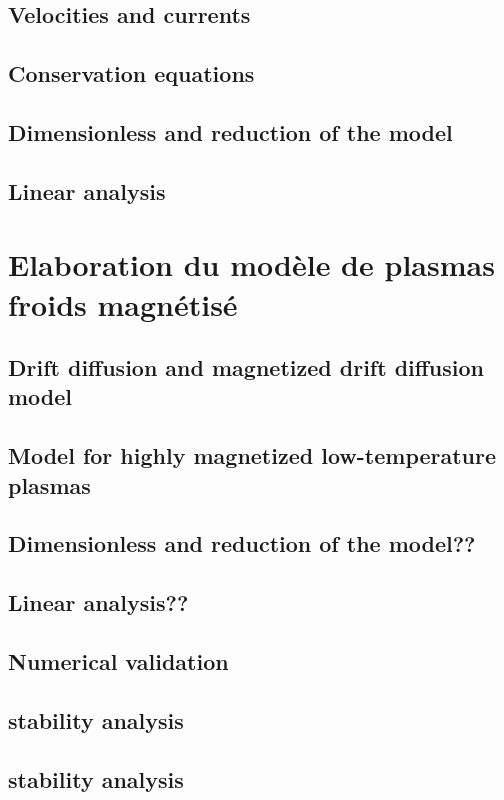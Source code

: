 		\subsection{Velocities and currents}
		\subsection{Conservation equations}
		\subsection{Dimensionless and reduction of the model}
		\subsection{Linear analysis}
	\section{Elaboration du modèle de plasmas froids magnétisé}
		\subsection{Drift diffusion and magnetized drift diffusion model}
		\subsection{Model for highly magnetized low-temperature plasmas}
		\subsection{Dimensionless and reduction of the model??}
		\subsection{Linear analysis??}
		\subsection{Numerical validation}
		\subsection{stability analysis}
		\subsection{stability analysis}
